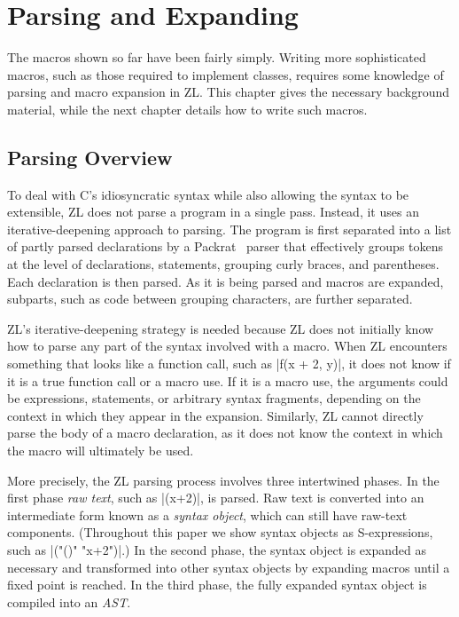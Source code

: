 \chapter{Parsing and Expanding}
\label{parsing}

The macros shown so far have been fairly simply.  Writing more
sophisticated macros, such as those required to implement classes,
requires some knowledge of parsing and macro expansion in ZL.  This
chapter gives the necessary background material, while the next
chapter details how to write such macros.

\section{Parsing Overview}
\label{parsing-overview}

To deal with C's idiosyncratic syntax while also allowing the syntax
to be extensible, ZL does not parse a program in a single pass.
Instead, it uses an iterative-deepening approach to parsing.  The
program is first separated into a list of partly parsed declarations
by a Packrat~\cite{peg-p,peg} parser that effectively groups
tokens at the level of declarations, statements, grouping curly
braces, and parentheses.  Each declaration is then parsed.  As it is
being parsed and macros are expanded, subparts, such as code between
grouping characters, are further separated.

ZL's iterative-deepening strategy is needed because ZL does not
initially know how to parse any part of the syntax involved with a
macro. When ZL encounters something that looks like a function call,
such as |f(x + 2, y)|, it does not know if it is a true function call
or a macro use.  If it is a macro use, the arguments could be
expressions, statements, or arbitrary syntax fragments, depending on
the context in which they appear in the expansion.  Similarly, ZL
cannot directly parse the body of a macro declaration, as it does not
know the context in which the macro will ultimately be used.

More precisely, the ZL parsing process involves three intertwined
phases.  In the first phase \textit{raw text}, such as |(x+2)|, is
parsed.  Raw text is converted into an intermediate form known as a
\textit{syntax object}, which can still have raw-text components.  
(Throughout this paper we show syntax objects as
S-expressions, such as |("()" "x+2")|.)  In the second phase, the
syntax object is expanded as necessary and transformed into other
syntax objects by expanding macros until a fixed point is reached.  In
the third phase, the fully expanded syntax object is compiled into an
\textit{AST}.

